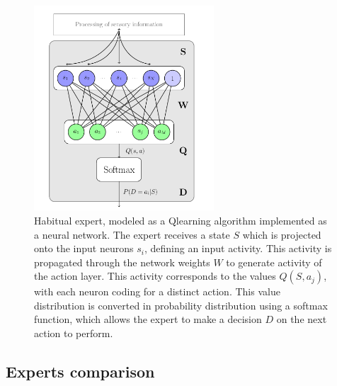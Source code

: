 \documentclass[english,a4paper,11pt,twoside]{StyleThese}
\begin{document}
\begin{figure}[!h]
	\centering
    \includegraphics[width=0.6\textwidth]{figs/Chapter7/Qlearning.png}
    \caption{Habitual expert, modeled as a Qlearning algorithm implemented as a neural network. The expert receives a state $S$ which is projected onto the input neurons $s_i$, defining an input activity. This activity is propagated through the network weights $W$ to generate activity of the action layer. This activity corresponds to the values $Q(S, a_j)$, with each neuron coding for a distinct action. This value distribution is converted in probability distribution using a softmax function, which allows the expert to make a decision $D$ on the next action to perform.}
    \label{fig:Qlearning}
\end{figure}

\subsection{Experts comparison}
\end{document}
